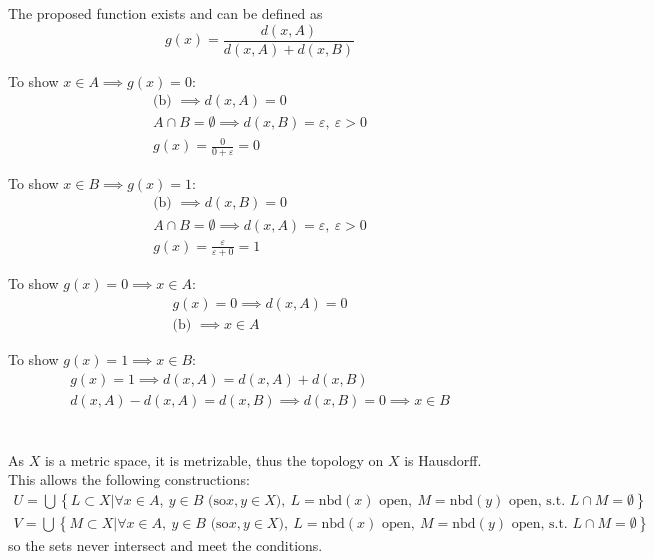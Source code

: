 \documentclass{jhwhw}
\begin{document}
\part{}%
The proposed function exists and can be defined as
\begin{equation}
g(x)= \frac{d(x,A)}{d(x,A)+d(x,B)}
\end{equation}

To show $x\in A \implies g(x) = 0$:
\begin{gather}
\text{(b) }\implies d(x,A)=0\\
A\cap B = \emptyset \implies d(x,B)=\varepsilon, \: \varepsilon>0\\
g(x) = \frac{0}{0+\varepsilon}=0
\end{gather}

To show $x\in B \implies g(x) = 1$:
\begin{gather}
\text{(b) }\implies d(x,B)=0\\
A\cap B = \emptyset \implies d(x,A)=\varepsilon, \: \varepsilon>0\\
g(x) = \frac{\varepsilon}{\varepsilon+0}=1
\end{gather}

To show $g(x) = 0\implies x\in A $:
\begin{gather}
g(x) = 0 \implies d(x,A)=0\\
\text{(b) }\implies x\in A
\end{gather}

To show $g(x) = 1\implies x\in B $:
\begin{gather}
g(x) = 1 \implies d(x,A)=d(x,A)+d(x,B)\\
d(x,A)-d(x,A)=d(x,B)\implies d(x,B)=0 \implies x\in B
\end{gather}

\part{}%
As $X$ is a metric space, it is metrizable, thus the topology on $X$ is Hausdorff. This allows the following constructions:
\begin{gather}
U=\bigcup\left\{ L\subset X | \forall x\in A,\: y\in B\text{ (so} x,y \in X \text{)}, \: L=\text{nbd}(x) \text{ open}, \: M=\text{nbd}(y) \text{ open, s.t. } L\cap M=\emptyset\right\}\\
V=\bigcup\left\{ M\subset X | \forall x\in A,\: y\in B\text{ (so} x,y \in X \text{)}, \: L=\text{nbd}(x) \text{ open}, \: M=\text{nbd}(y) \text{ open, s.t. } L\cap M=\emptyset\right\}
\end{gather}
so the sets never intersect and meet the conditions.
\end{document}
